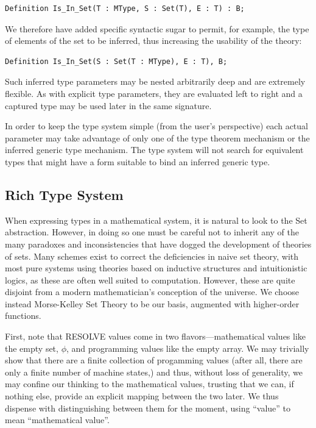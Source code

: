 \begin{lstlisting}
Definition Is_In_Set(T : MType, S : Set(T), E : T) : B;
\end{lstlisting}

We therefore have added specific syntactic sugar to permit, for example, the type of elements of the set to be inferred, thus increasing the usability of the theory:

\begin{lstlisting}
Definition Is_In_Set(S : Set(T : MType), E : T), B;
\end{lstlisting}

Such inferred type parameters may be nested arbitrarily deep and are extremely flexible.  As with explicit type parameters, they are evaluated left to right and a captured type may be used later in the same signature.

In order to keep the type system simple (from the user's perspective) each actual parameter may take advantage of only one of the type theorem mechanism or the inferred generic type mechanism.  The type system will not search for equivalent types that might have a form suitable to bind an inferred generic type.

	\subsection{Rich Type System\label{richTypeSystem}}

When expressing types in a mathematical system, it is natural to look to the Set abstraction.  However, in doing so one must be careful not to inherit any of the many paradoxes and inconsistencies that have dogged the development of theories of sets.  Many schemes exist to correct the deficiencies in naive set theory, with most pure systems using theories based on inductive structures and intuitionistic logics, as these are often well suited to computation.  However, these are quite disjoint from a modern mathematician's conception of the universe.  We choose instead Morse-Kelley Set Theory to be our basis, augmented with higher-order functions.

First, note that RESOLVE values come in two flavors---mathematical values like the empty set, $\phi$, and programming values like the empty array.  We may trivially show that there are a finite collection of progamming values (after all, there are only a finite number of machine states,) and thus, without loss of generality, we may confine our thinking to the mathematical values, trusting that we can, if nothing else, provide an explicit mapping between the two later.  We thus dispense with distinguishing between them for the moment, using ``value'' to mean ``mathematical value''.

